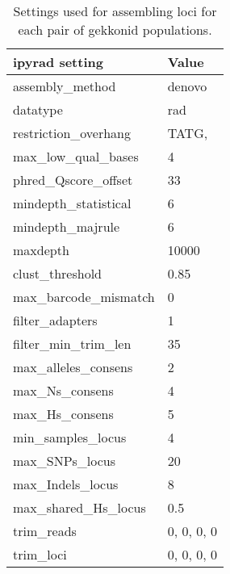 \begin{table}[htbp]
\sffamily
\captionsetup{name=Table S, labelformat=noSpace}
\caption{
    Settings used for assembling loci for each pair of gekkonid populations.
}
\centering
\begin{tabular}{ l l }
    \textbf{ipyrad setting} & \textbf{Value} \\
    \hline
    assembly\_method & denovo \\
    datatype & rad \\
    restriction\_overhang & TATG, \\
    max\_low\_qual\_bases & 4 \\
    phred\_Qscore\_offset & 33 \\
    mindepth\_statistical & 6 \\
    mindepth\_majrule & 6 \\
    maxdepth & 10000 \\
    clust\_threshold & 0.85 \\
    max\_barcode\_mismatch & 0 \\
    filter\_adapters & 1 \\
    filter\_min\_trim\_len & 35 \\
    max\_alleles\_consens & 2 \\
    max\_Ns\_consens & 4 \\
    max\_Hs\_consens & 5 \\
    min\_samples\_locus & 4 \\
    max\_SNPs\_locus & 20 \\
    max\_Indels\_locus & 8 \\
    max\_shared\_Hs\_locus & 0.5 \\
    trim\_reads & 0, 0, 0, 0 \\
    trim\_loci & 0, 0, 0, 0 \\
    \hline
\end{tabular}
\label{table:ipyradsettings}
\end{table}

